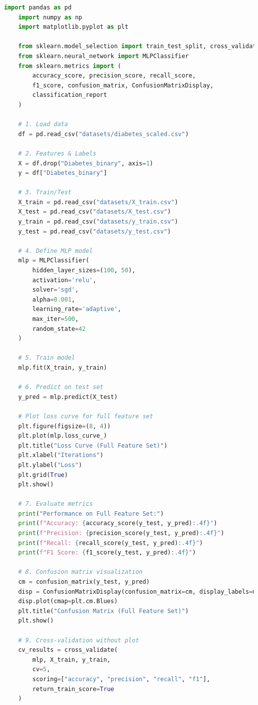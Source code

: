 \begin{lstlisting}[language=Python, label={lst:mlp_classifier}]
    import pandas as pd
    import numpy as np
    import matplotlib.pyplot as plt
    
    from sklearn.model_selection import train_test_split, cross_validate
    from sklearn.neural_network import MLPClassifier
    from sklearn.metrics import (
        accuracy_score, precision_score, recall_score,
        f1_score, confusion_matrix, ConfusionMatrixDisplay,
        classification_report
    )
    
    # 1. Load data
    df = pd.read_csv("datasets/diabetes_scaled.csv")
    
    # 2. Features & Labels
    X = df.drop("Diabetes_binary", axis=1)
    y = df["Diabetes_binary"]
    
    # 3. Train/Test
    X_train = pd.read_csv("datasets/X_train.csv")
    X_test = pd.read_csv("datasets/X_test.csv")
    y_train = pd.read_csv("datasets/y_train.csv")
    y_test = pd.read_csv("datasets/y_test.csv")
    
    # 4. Define MLP model
    mlp = MLPClassifier(
        hidden_layer_sizes=(100, 50),
        activation='relu',
        solver='sgd',
        alpha=0.001,
        learning_rate='adaptive',
        max_iter=500,
        random_state=42
    )
    
    # 5. Train model
    mlp.fit(X_train, y_train)
    
    # 6. Predict on test set
    y_pred = mlp.predict(X_test)
    
    # Plot loss curve for full feature set
    plt.figure(figsize=(8, 4))
    plt.plot(mlp.loss_curve_)
    plt.title("Loss Curve (Full Feature Set)")
    plt.xlabel("Iterations")
    plt.ylabel("Loss")
    plt.grid(True)
    plt.show()
    
    # 7. Evaluate metrics
    print("Performance on Full Feature Set:")
    print(f"Accuracy: {accuracy_score(y_test, y_pred):.4f}")
    print(f"Precision: {precision_score(y_test, y_pred):.4f}")
    print(f"Recall: {recall_score(y_test, y_pred):.4f}")
    print(f"F1 Score: {f1_score(y_test, y_pred):.4f}")
    
    # 8. Confusion matrix visualization
    cm = confusion_matrix(y_test, y_pred)
    disp = ConfusionMatrixDisplay(confusion_matrix=cm, display_labels=mlp.classes_)
    disp.plot(cmap=plt.cm.Blues)
    plt.title("Confusion Matrix (Full Feature Set)")
    plt.show()
    
    # 9. Cross-validation without plot
    cv_results = cross_validate(
        mlp, X_train, y_train,
        cv=5,
        scoring=["accuracy", "precision", "recall", "f1"],
        return_train_score=True
    )
    

\end{lstlisting}
